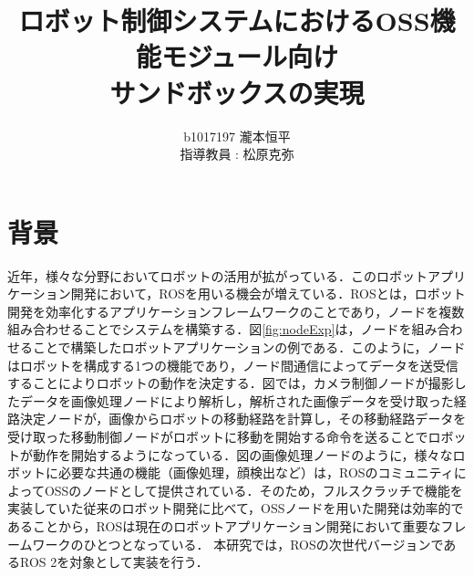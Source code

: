 \documentclass[11pt]{ujarticle} %
\author{
b1017197 瀧本恒平\\指導教員 : 松原克弥
}
\title{ロボット制御システムにおけるOSS機能モジュール向け\\サンドボックスの実現}
\begin{document}
\maketitle

\section{背景}
近年，様々な分野においてロボットの活用が拡がっている\cite{Pepper}\cite{RoBoHoN}．このロボットアプリケーション開発において，ROSを用いる機会が増えている．ROSとは，ロボット開発を効率化するアプリケーションフレームワークのことであり，ノードを複数組み合わせることでシステムを構築する．図\ref{fig:nodeExp}は，ノードを組み合わせることで構築したロボットアプリケーションの例である．このように，ノードはロボットを構成する1つの機能であり，ノード間通信によってデータを送受信することによりロボットの動作を決定する．図では，カメラ制御ノードが撮影したデータを画像処理ノードにより解析し，解析された画像データを受け取った経路決定ノードが，画像からロボットの移動経路を計算し，その移動経路データを受け取った移動制御ノードがロボットに移動を開始する命令を送ることでロボットが動作を開始するようになっている．図の画像処理ノードのように，様々なロボットに必要な共通の機能（画像処理\cite{ROSexample}，顔検出\cite{facedetector}など）は，ROSのコミュニティによってOSSのノードとして提供されている．そのため，フルスクラッチで機能を実装していた従来のロボット開発に比べて，OSSノードを用いた開発は効率的であることから，ROSは現在のロボットアプリケーション開発において重要なフレームワークのひとつとなっている．
本研究では，ROSの次世代バージョンであるROS 2を対象として実装を行う．
\end{document}
